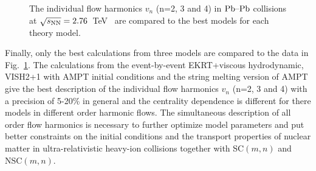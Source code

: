 \begin{figure}[h]
\begin{center}
        \caption{The individual flow harmonics $v_n$ (n=2, 3 and 4) in $\textnormal{Pb--Pb}$ collisions at $\sqrt{s_{\textnormal{NN}}}=2.76$~TeV~\cite{Adam:2016izf} are compared to the best models for each theory model.}
        \label{fig:Figure_11}
              \end{center}
\end{figure}

Finally, only the best calculations from three models are compared to the data in Fig.~\ref{fig:Figure_11}.
The calculations from the event-by-event EKRT+viscous hydrodynamic, VISH2+1 with AMPT initial conditions and the string melting version of AMPT give the best description of the individual flow harmonics $v_n$ (n=2, 3 and 4) with a precision of 5-20\% in general and the centrality dependence is different for there models in different order harmonic flows.
The simultaneous description of all order flow harmonics is necessary to further optimize model parameters and put better constraints on the initial conditions and the transport properties of nuclear matter in ultra-relativistic heavy-ion collisions together with SC$(m,n)$ and NSC$(m,n)$.
